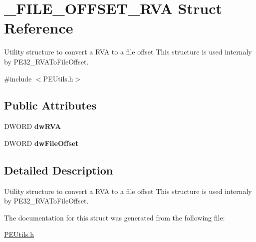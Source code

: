 \hypertarget{struct___f_i_l_e___o_f_f_s_e_t___r_v_a}{}\section{\+\_\+\+F\+I\+L\+E\+\_\+\+O\+F\+F\+S\+E\+T\+\_\+\+R\+VA Struct Reference}
\label{struct___f_i_l_e___o_f_f_s_e_t___r_v_a}


Utility structure to convert a R\+VA to a file offset This structure is used internaly by P\+E32\+\_\+\+R\+V\+A\+To\+File\+Offset.  




{\ttfamily \#include $<$P\+E\+Utils.\+h$>$}

\subsection*{Public Attributes}
\begin{DoxyCompactItemize}
\item 
\mbox{\label{struct___f_i_l_e___o_f_f_s_e_t___r_v_a_adf0c6578fd334c377c5db34ff4318036}} 
D\+W\+O\+RD {\bfseries dw\+R\+VA}
\item 
\mbox{\label{struct___f_i_l_e___o_f_f_s_e_t___r_v_a_a4379d7b472f456f5f02a60a6ec664c61}} 
D\+W\+O\+RD {\bfseries dw\+File\+Offset}
\end{DoxyCompactItemize}


\subsection{Detailed Description}
Utility structure to convert a R\+VA to a file offset This structure is used internaly by P\+E32\+\_\+\+R\+V\+A\+To\+File\+Offset. 

The documentation for this struct was generated from the following file\+:\begin{DoxyCompactItemize}
\item 
\mbox{\hyperlink{_p_e_utils_8h}{P\+E\+Utils.\+h}}\end{DoxyCompactItemize}
